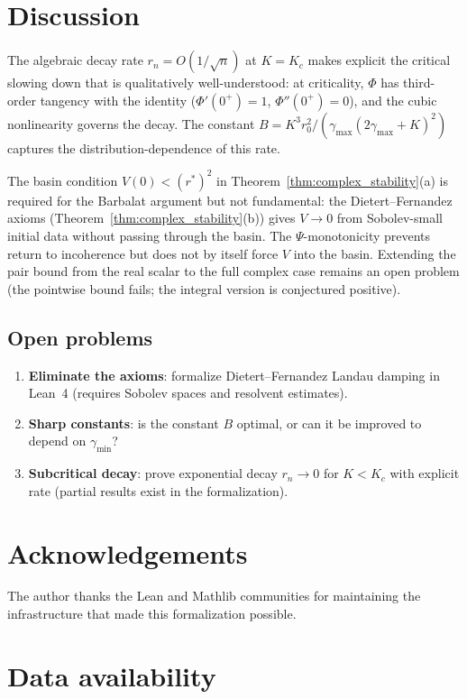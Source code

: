 \documentclass[12pt]{article}
\theoremstyle{definition}
\begin{document}
\section{Discussion}

The algebraic decay rate $r_n = O(1/\sqrt{n})$ at $K = K_c$
makes explicit the critical slowing down that is qualitatively
well-understood: at criticality, $\Phi$ has third-order tangency with
the identity ($\Phi'(0^+) = 1$, $\Phi''(0^+) = 0$), and the cubic
nonlinearity governs the decay.  The constant
$B = K^3 r_0^2/(\gamma_{\max}(2\gamma_{\max}+K)^2)$ captures the
distribution-dependence of this rate.

The basin condition $V(0) < (r^*)^2$ in Theorem~\ref{thm:complex_stability}(a)
is required for the Barbalat argument but not fundamental:
the Dietert--Fernandez axioms (Theorem~\ref{thm:complex_stability}(b))
gives $V \to 0$ from Sobolev-small initial data without passing through
the basin.  The $\Psi$-monotonicity prevents return to incoherence
but does not by itself force $V$ into the basin.
Extending the pair bound from the real scalar to the full complex
case remains an open problem (the pointwise bound fails; the
integral version is conjectured positive).

\subsection*{Open problems}
\begin{enumerate}
\item \textbf{Eliminate the axioms}: formalize Dietert--Fernandez Landau
damping in Lean~4 (requires Sobolev spaces and resolvent estimates).
\item \textbf{Sharp constants}: is the constant $B$ optimal, or can it be
improved to depend on $\gamma_{\min}$?
\item \textbf{Subcritical decay}: prove exponential decay $r_n \to 0$
for $K < K_c$ with explicit rate (partial results exist in the formalization).
\end{enumerate}

\section*{Acknowledgements}

The author thanks the Lean and Mathlib communities for maintaining the
infrastructure that made this formalization possible.

\section*{Data availability}
\end{document}
